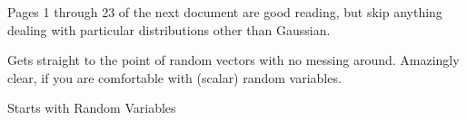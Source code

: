 \documentclass[12pt,letterpaper,headings=normal]{scrartcl}
\begin{document}

\vspace*{\fill}
Pages 1 through 23 of the next document are good reading, but skip anything dealing with particular distributions other than Gaussian.
\vspace*{\fill}

\vspace*{\fill}
Gets straight to the point of random vectors with no messing around. Amazingly clear, if you are comfortable with (scalar) random variables.
\vspace*{\fill}


Starts with Random Variables
\vspace*{\fill}

\end{document}
